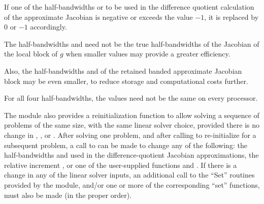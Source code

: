 {
  If one of the half-bandwidths  or  to be used in the
  difference quotient calculation of the approximate Jacobian is negative or
  exceeds the value $-1$, it is replaced by 0 or
  $-1$ accordingly.

  The half-bandwidths  and  need not be the true
  half-bandwidths of the Jacobian of the local block of $g$
  when smaller values may provide a greater efficiency.

  Also, the half-bandwidths  and  of the retained
  banded approximate Jacobian block may be even smaller,
  to reduce storage and computational costs further.

  For all four half-bandwidths, the values need not be the
  same on every processor.
}


The {\cvbbdpre} module also provides a reinitialization function to allow
solving a sequence of problems of the same size, with the same linear solver
choice, provided there is no change in , , or .
After solving one problem, and after calling  to
re-initialize {\cvodes} for a subsequent problem, a call to 
can be made to change any of the following: the half-bandwidths  and
 used in the difference-quotient Jacobian approximations, the relative
increment , or one of the user-supplied functions  and .
If there is a change in any of the linear solver inputs, an additional call
to the ``Set'' routines provided by the {\sunlinsol} module, and/or
one or more of the corresponding {\cvls} ``set'' functions, must
also be made (in the proper order).

